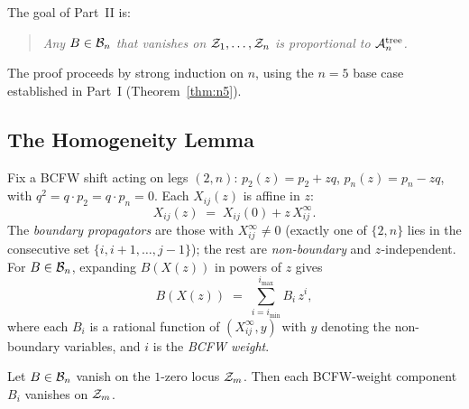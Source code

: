 The goal of Part~II is:

\begin{quote}
  \emph{Any $B \in \mathcal{B}_n$ that vanishes on
  $\mathcal{Z}_1, \ldots, \mathcal{Z}_n$ is proportional to $\mathcal{A}_n^{\mathrm{tree}}$.}
\end{quote}

\noindent
The proof proceeds by strong induction on $n$, using
the $n = 5$ base case established in Part~I (Theorem~\ref{thm:n5}).

\subsection{The Homogeneity Lemma}
\label{ssec:homogeneity}

\begin{definition}
Fix a BCFW shift acting on legs $(2,n)$:
$p_2(z) = p_2 + zq$, $p_n(z) = p_n - zq$, with
$q^2 = q\cdot p_2 = q\cdot p_n = 0$.
Each $X_{ij}(z)$ is affine in $z$:
\begin{equation}
  X_{ij}(z) \;=\; X_{ij}(0) + z\, X_{ij}^\infty.
  \label{eq:Xz}
\end{equation}
The \emph{boundary propagators} are those with
$X_{ij}^\infty \ne 0$ (exactly one of $\{2, n\}$ lies
in the consecutive set $\{i, i{+}1, \ldots, j{-}1\}$);
the rest are \emph{non-boundary} and $z$-independent.
For $B \in \mathcal{B}_n$, expanding $B(X(z))$ in powers of $z$ gives
\[
  B(X(z)) \;=\; \sum_{i=i_{\min}}^{i_{\max}} B_i\, z^i,
\]
where each $B_i$ is a rational function of
$(X_{ij}^\infty, y)$ with $y$ denoting the non-boundary
variables, and $i$ is the \emph{BCFW weight}.
\end{definition}

\begin{lemma}
\label{lem:homogeneity}
Let $B \in \mathcal{B}_n$ vanish on the $1$-zero locus $\mathcal{Z}_m$.
Then each BCFW-weight component $B_i$ vanishes on $\mathcal{Z}_m$.
\end{lemma}

